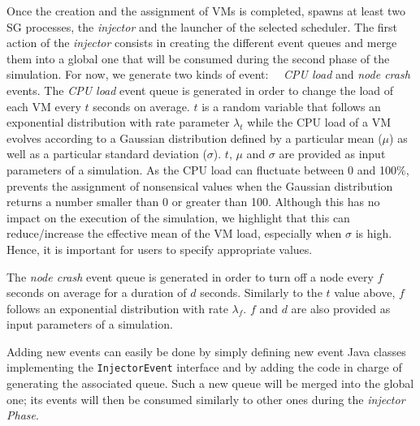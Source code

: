 Once the creation and the assignment of VMs is completed, \vmps spawns
at least two SG processes, the \emph{injector} and the launcher of the
selected scheduler.  The first action of the \emph{injector} consists
in creating the different event queues and merge them into a global
one that will be consumed during the second phase of the simulation.
For now, we generate two kinds of event: ~~\emph{CPU load} and
\emph{node crash} events.
%
The \emph{CPU load} event queue is generated in order to change the
load of each VM every $t$ seconds on average. $t$ is a random variable
that follows an exponential distribution with rate parameter
$\lambda_t$ while the CPU load of a VM evolves according to a
Gaussian distribution defined by a particular mean ($\mu$) as well as
a particular standard deviation ($\sigma$). $t$, $\mu$ and $\sigma$
are provided as input parameters of a simulation.  As the CPU load can
fluctuate between 0 and 100\%, \vmps prevents the assignment of
nonsensical values when the Gaussian distribution returns a number
smaller than 0 or greater than 100. Although this has no impact on the
execution of the simulation, we highlight that this can
reduce/increase the effective mean of the VM load, especially when
$\sigma$ is high.  Hence, it is important for users to specify
appropriate values.

The \emph{node crash} event queue is generated in order to turn off a
node every $f$ seconds on average for a duration of $d$ seconds.
Similarly to the $t$ value above, $f$ follows an exponential
distribution with rate $\lambda_f$. $f$ and $d$ are also provided as
input parameters of a simulation.

Adding new events can easily be done by simply defining new event Java
classes implementing the \texttt{InjectorEvent} interface and by
adding the code in charge of generating the associated queue. Such a
new queue will be merged into the global one; its events will then be
consumed similarly to other ones during the \emph{injector Phase}.

